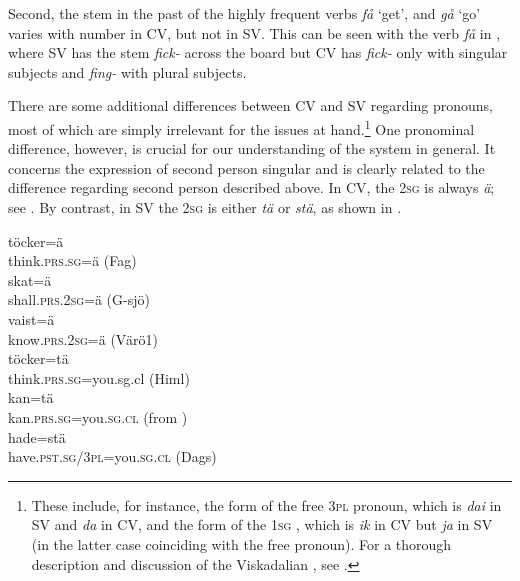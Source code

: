 \documentclass[output=paper,colorlinks,citecolor=brown,draft,draftmode]{langscibook}
\begin{document}
Second, the stem in the past  of the highly frequent verbs \textit{få} ‘get’, and \textit{gå} ‘go’ varies with number in CV, but not in SV. This can be seen with the verb \textit{få} in , where SV has the stem \textit{fick-} across the board but CV has \textit{fick-} only with singular subjects and \textit{fing-} with plural subjects.



There are some additional differences between CV and SV regarding pronouns, most of which are simply irrelevant for the issues at hand.\footnote{These include, for instance, the form of the free 3\textsc{pl} pronoun, which is \textit{dai} in SV and \textit{da} in CV, and the form of the 1\textsc{sg} , which is \textit{ik} in CV but \textit{ja} in SV (in the latter case coinciding with the free pronoun). For a thorough description and discussion of the Viskadalian , see \citet{Petzell2017}.} One pronominal difference, however, is crucial for our understanding of the  system in general. It concerns the expression of second person singular and is clearly related to the difference regarding second person  described above. In CV, the 2\textsc{sg}  is always \textit{ä}; see . By contrast, in SV the 2\textsc{sg}  is either \textit{tä} or \textit{stä}, as shown in .


\ea\label{ex:petzell:19}
\ea\label{ex:petzell:19a}
\gll töcker=ä \\
    think.\textsc{prs.sg=}ä (Fag)    \\
\ex\label{ex:petzell:19b}
\gll skat=ä   \\
    shall.\textsc{prs}.2\textsc{sg}=ä (G-sjö)  \\
\ex\label{ex:petzell:19c}
\gll vaist=ä   \\
    know.\textsc{prs}.2\textsc{sg}=ä (Värö1)\\
\z
\ex\label{ex:petzell:20}
\ea\label{ex:petzell:20a}
\gll töcker=tä \\
    think.\textsc{prs.sg}=you.sg.cl (Himl)  \\
\ex\label{ex:petzell:20b}
\gll kan=tä   \\
    kan.\textsc{prs.sg}=you.\textsc{sg}.\textsc{cl} (from \citealt{Andersson1922})  \\
\ex\label{ex:petzell:20c}
\gll hade=stä   \\
    have.\textsc{pst}.\textsc{sg}/3\textsc{pl}=you.\textsc{sg}.\textsc{cl} (Dags)\\
\z
\z
\end{document}

